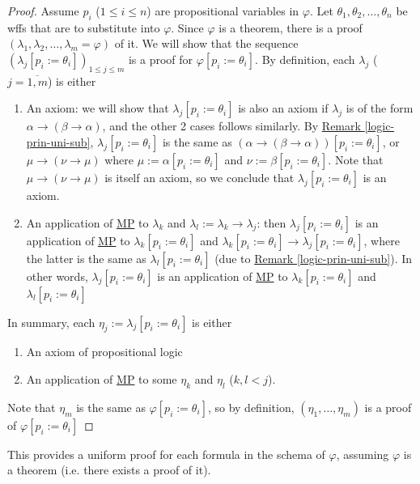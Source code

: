 \documentclass{treatise}
\begin{document}
\begin{proof}
Assume $p_i$ ($1 \leq i \leq n$) are propositional variables in $\varphi$. Let $\theta_1, \theta_2, \hdots, \theta_n$ be wffs that are to substitute into $\varphi$. Since $\varphi$ is a theorem, there is a proof $(\lambda_1, \lambda_2, \hdots, \lambda_m = \varphi)$ of it. We will show that the sequence $(\lambda_j [p_i := \theta_i])_{1 \leq j \leq m}$ is a proof for $\varphi[p_i := \theta_i]$. By definition, each $\lambda_j$ ($j = \overline{1, m}$) is either
\begin{enumerate}
    \item An axiom: we will show that $\lambda_j[p_i := \theta_i]$ is also an axiom if $\lambda_j$ is of the form $\alpha \to (\beta \to \alpha)$, and the other 2 cases follows similarly. By \hyperref[logic-prin-uni-sub]{Remark \ref*{logic-prin-uni-sub}}, $\lambda_j[p_i := \theta_i]$ is the same as $(\alpha \to (\beta \to \alpha))[p_i := \theta_i]$, or $\mu \to (\nu \to \mu)$ where $\mu := \alpha[p_i := \theta_i]$ and $\nu := \beta[p_i := \theta_i]$. Note that $\mu \to (\nu \to \mu)$ is itself an axiom, so we conclude that $\lambda_j [p_i := \theta_i]$ is an axiom.
    \item An application of \hyperref[HPL-R-MP]{MP} to $\lambda_k$ and $\lambda_l := \lambda_k \to \lambda_j$: then $\lambda_j[p_i := \theta_i]$ is an application of \hyperref[HPL-R-MP]{MP} to $\lambda_k [p_i := \theta_i]$ and $\lambda_k [p_i := \theta_i] \to \lambda_j [p_i := \theta_i]$, where the latter is the same as $\lambda_l [p_i := \theta_i]$ (due to \hyperref[logic-prin-uni-sub]{Remark \ref*{logic-prin-uni-sub}}). In other words, $\lambda_j [p_i := \theta_i]$ is an application of \hyperref[HPL-R-MP]{MP} to $\lambda_k[p_i := \theta_i]$ and $\lambda_l[p_i := \theta_i]$
\end{enumerate}
In summary, each $\eta_j := \lambda_j [p_i := \theta_i]$ is either
\begin{enumerate}
    \item An axiom of propositional logic
    \item An application of \hyperref[HPL-R-MP]{MP} to some $\eta_k$ and $\eta_l$ ($k, l < j$).
\end{enumerate}
Note that $\eta_m$ is the same as $\varphi[p_i := \theta_i]$, so by definition, $(\eta_1, \hdots, \eta_m)$ is a proof of $\varphi[p_i := \theta_i]$
\end{proof}
\begin{remark}
This provides a uniform proof for each formula in the schema of $\varphi$, assuming $\varphi$ is a theorem (i.e. there exists a proof of it).
\end{remark}
\end{document}
